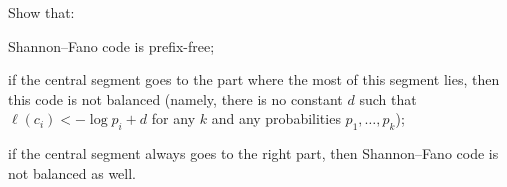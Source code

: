 Show that:
\begin{enumlet}
    \item Shannon--Fano code is prefix-free;
    \item if the central segment goes to the part where the most of this segment lies, then this code is
        not balanced (namely, there is no constant $d$ such that $\ell(c_i) < -\log{p_i} + d$ for any $k$
        and any probabilities $p_1, \dots, p_k$);
    \item if the central segment always goes to the right part, then Shannon--Fano code is not balanced
        as well. 
\end{enumlet}